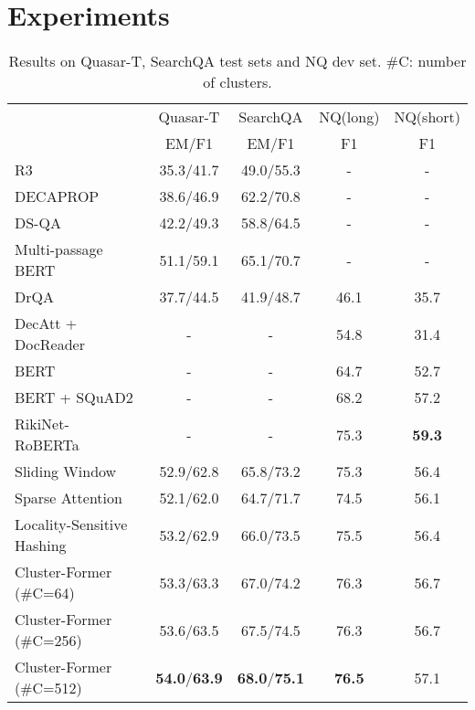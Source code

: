 


\section{Experiments}

\begin{table*}[t]
\centering
\begin{tabular}{lcccc}
\toprule
                           & Quasar-T & SearchQA  & NQ(long) & NQ(short) \\
                           & EM/F1     & EM/F1     & F1       & F1        \\
\midrule                
R3~\citep{wang2018r}                         & 35.3/41.7 & 49.0/55.3 & -        & -         \\
DECAPROP~\citep{tay2018densely} &38.6/46.9 & 62.2/70.8 &- &-\\
DS-QA~\citep{lin2018denoising}                      & 42.2/49.3 & 58.8/64.5 & -        & -         \\
Multi-passage BERT~\citep{wang2019multi}         & 51.1/59.1 & 65.1/70.7 & -        & -         \\
DrQA~\citep{chen2017reading}                       & 37.7/44.5 & 41.9/48.7 & 46.1     & 35.7      \\
DecAtt + DocReader~\citep{kwiatkowski2019natural}         & -         & -         & 54.8     & 31.4      \\
BERT~\citep{alberti2019bert}                  & -         & -         & 64.7     & 52.7      \\
BERT + SQuAD2~\citep{pan2019frustratingly} & -         & -         & 68.2    & 57.2       \\
RikiNet-RoBERTa~\citep{liu2020rikinet} & -         & -         & 75.3    & \textbf{59.3}       \\
\midrule
Sliding Window   & 52.9/62.8 & 65.8/73.2 & 75.3     & 56.4\\
Sparse Attention~\citep{sparsetransf}               & 52.1/62.0 & 64.7/71.7 & 74.5     & 56.1\\
Locality-Sensitive Hashing~\citep{reformer}       & 53.2/62.9 & 66.0/73.5 & 75.5     & 56.4\\
\midrule
Cluster-Former (\#C=64)        & 53.3/63.3 & 67.0/74.2 & 76.3     & 56.7\\
Cluster-Former (\#C=256)       & 53.6/63.5 & 67.5/74.5 & 76.3     & 56.7\\
Cluster-Former (\#C=512)       & \textbf{54.0}/\textbf{63.9} & \textbf{68.0}/\textbf{75.1} & \textbf{76.5}     & 57.1\\
\bottomrule
\end{tabular}
\caption{  Results on Quasar-T, SearchQA test sets and NQ dev set.  \#C: number of clusters.}
\label{tbl:qa}
\end{table*}

